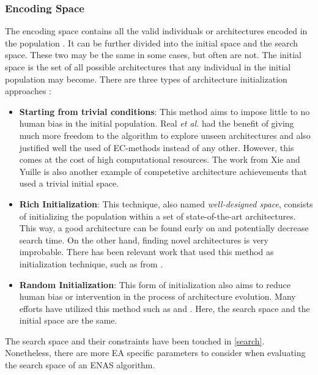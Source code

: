 \documentclass[10pt,        %
               a4paper,     %
               journal,     %
               ]{IEEEtran}
\begin{document}
\subsubsection{Encoding Space}
The encoding space contains all the valid individuals or architectures encoded in the population \cite{liu2021survey}.
It can be further divided into the initial space and the search space. These two may be the same in some cases,
but often are not. The initial space is the set of all possible architectures that any individual in the initial population may
become. There are three types of architecture initialization approaches \cite{liu2021survey}:

\begin{itemize}
    \item \textbf{Starting from trivial conditions}: This method aims to impose little to no human bias in the initial
     population. Real \textit{et al.} \cite{pmlr-v70-real17a} had the benefit of giving much more freedom to the algorithm
     to explore unseen architectures and also justified well the used of EC-methods instead of any other.
     However, this comes at the cost of high computational resources. The work from Xie and Yuille \cite{xie2017genetic} is
     also another example of competetive architecture achievements that used a trivial initial space.

    \item \textbf{Rich Initialization}: This technique, also named \textit{well-designed space}, consists of initializing
    the population within a set of state-of-the-art architectures. This way, a good architecture can be found early on
    and potentially decrease search time. On the other hand, finding novel architectures is very improbable. There has been
    relevant work that used this method as initialization technique, such as from \cite{fujino2017deep}.

    \item \textbf{Random Initialization}: This form of initialization also aims to reduce human bias or intervention in
     the process of architecture evolution. Many efforts have utilized this method such as \cite{sun2019evolving} and
     \cite{sun2019completely}. Here, the search space and the initial space are the same.
\end{itemize}

The search space and their constraints have been touched in \ref{search}. Nonetheless, there are more EA specific
parameters to consider when evaluating the search space of an ENAS algorithm.
\end{document}
